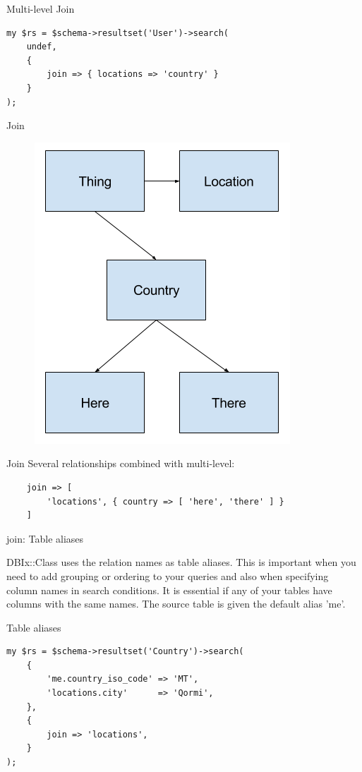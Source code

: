 \begin{frame}[fragile]{Multi-level Join}
\begin{lstlisting}
my $rs = $schema->resultset('User')->search(
    undef,
    {
        join => { locations => 'country' }
    }
);
\end{lstlisting}
\end{frame}

\begin{frame}[fragile]{Join}
\begin{figure}[!ht]
\centering
\includegraphics[width=0.4\linewidth]{img/join-complex.png}
\end{figure}
\end{frame}

\begin{frame}[fragile]{Join}
Several relationships combined with multi-level:

\begin{lstlisting}
    join => [
        'locations', { country => [ 'here', 'there' ] }
    ]
\end{lstlisting}
\end{frame}

join: Table aliases

DBIx::Class uses the relation names as table aliases. This is important when
you need to add grouping or ordering to your queries and also when
specifying column names in search conditions. It is essential if any of your
tables have columns with the same names. The source table is given the
default alias 'me'.

\begin{frame}[fragile]{Table aliases}
\begin{lstlisting}
my $rs = $schema->resultset('Country')->search(
    {
        'me.country_iso_code' => 'MT',
        'locations.city'      => 'Qormi',
    },
    {
        join => 'locations',
    }
);
\end{lstlisting}
\end{frame}

